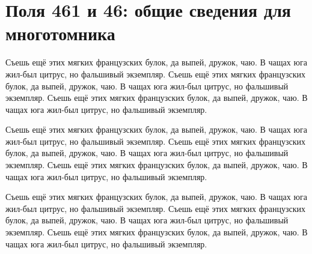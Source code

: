 \chapter{Поля 461 и 46: общие сведения для многотомника}

Съешь ещё этих мягких французских булок, да выпей, дружок, чаю. В чащах юга жил-был цитрус, но фальшивый экземпляр. Съешь ещё этих мягких французских булок, да выпей, дружок, чаю. В чащах юга жил-был цитрус, но фальшивый экземпляр. Съешь ещё этих мягких французских булок, да выпей, дружок, чаю. В чащах юга жил-был цитрус, но фальшивый экземпляр.

Съешь ещё этих мягких французских булок, да выпей, дружок, чаю. В чащах юга жил-был цитрус, но фальшивый экземпляр. Съешь ещё этих мягких французских булок, да выпей, дружок, чаю. В чащах юга жил-был цитрус, но фальшивый экземпляр. Съешь ещё этих мягких французских булок, да выпей, дружок, чаю. В чащах юга жил-был цитрус, но фальшивый экземпляр.

Съешь ещё этих мягких французских булок, да выпей, дружок, чаю. В чащах юга жил-был цитрус, но фальшивый экземпляр. Съешь ещё этих мягких французских булок, да выпей, дружок, чаю. В чащах юга жил-был цитрус, но фальшивый экземпляр. Съешь ещё этих мягких французских булок, да выпей, дружок, чаю. В чащах юга жил-был цитрус, но фальшивый экземпляр.